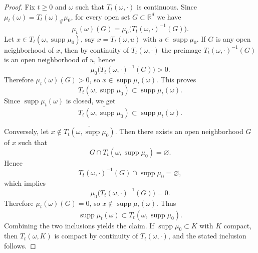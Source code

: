 \documentclass{tsp-short}
\theoremstyle{remark}
\theoremstyle{definition}
\begin{document}
\begin{proof}
Fix $t\ge0$ and $\omega$ such that $T_t(\omega,\cdot)$ is continuous.
Since $\mu_t(\omega)=T_t(\omega)_{\#}\mu_0$, for every open set $G\subset\mathbb{R}^d$ we have
\begin{equation*}
\mu_t(\omega)(G)=\mu_0\big(T_t(\omega,\cdot)^{-1}(G)\big).
\end{equation*}
Let $x\in T_t(\omega,\operatorname{supp}\mu_0)$, say $x=T_t(\omega,u)$ with $u\in\operatorname{supp}\mu_0$.
If $G$ is any open neighborhood of $x$, then by continuity of $T_t(\omega,\cdot)$ the preimage
$T_t(\omega,\cdot)^{-1}(G)$ is an open neighborhood of $u$, hence
\begin{equation*}
\mu_0\big(T_t(\omega,\cdot)^{-1}(G)\big)>0.
\end{equation*}
Therefore $\mu_t(\omega)(G)>0$, so $x\in\operatorname{supp}\mu_t(\omega)$.
This proves
\begin{equation*}
T_t(\omega,\operatorname{supp}\mu_0)\subset \operatorname{supp}\mu_t(\omega).
\end{equation*}
Since $\operatorname{supp}\mu_t(\omega)$ is closed, we get
\begin{equation*}
\overline{T_t(\omega,\operatorname{supp}\mu_0)}
\subset
\operatorname{supp}\mu_t(\omega).
\end{equation*}

Conversely, let $x\notin \overline{T_t(\omega,\operatorname{supp}\mu_0)}$.
Then there exists an open neighborhood $G$ of $x$ such that
\begin{equation*}
G\cap T_t(\omega,\operatorname{supp}\mu_0)=\varnothing.
\end{equation*}
Hence
\begin{equation*}
T_t(\omega,\cdot)^{-1}(G)\cap \operatorname{supp}\mu_0=\varnothing,
\end{equation*}
which implies
\begin{equation*}
\mu_0\big(T_t(\omega,\cdot)^{-1}(G)\big)=0.
\end{equation*}
Therefore $\mu_t(\omega)(G)=0$, so $x\notin\operatorname{supp}\mu_t(\omega)$.
Thus
\begin{equation*}
\operatorname{supp}\mu_t(\omega)\subset
\overline{T_t(\omega,\operatorname{supp}\mu_0)}.
\end{equation*}
Combining the two inclusions yields the claim.
If $\operatorname{supp}\mu_0\subset K$ with $K$ compact, then $T_t(\omega,K)$ is compact by continuity of $T_t(\omega,\cdot)$, and the stated inclusion follows.
\end{proof}
\end{document}
